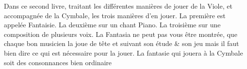 


Dans ce second livre, traitant les différentes manières de jouer de la Viole, et accompagnée de la Cymbale,
les trois manières d'en jouer. La première est appelée Fantaisie. La deuxième sur un chant Piano. %
La troisième sur une composition de plusieurs voix.
La Fantasia ne peut pas vous être montrée, que chaque bon musicien la joue de tête et suivant son étude \& son jeu
mais il faut bien dire ce qui est nécessaire pour la jouer. La fantasie qui jouera à la Cymbale soit des consonnances bien ordinaire 




